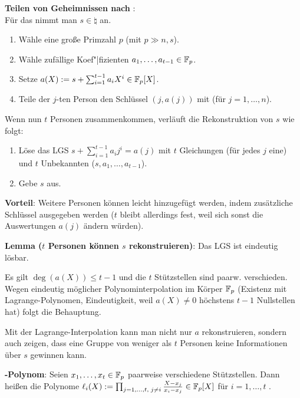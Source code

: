 \textbf{Teilen von Geheimnissen nach }:\\
Für das  nimmt man $s \in \natural$ an.
\begin{enumerate}
    \item
    Wähle eine große Primzahl $p$ (mit $p \gg n, s$).

    \item
    Wähle zufällige Koef"|fizienten $a_1, \dotsc, a_{t-1} \in \mathbb{F}_p$.

    \item
    Setze $a(X) := s + \sum_{i=1}^{t-1} a_i X^i \in \mathbb{F}_p[X]$.

    \item
    Teile der $j$-ten Person den Schlüssel $(j, a(j))$ mit (für $j = 1, \dotsc, n$).
\end{enumerate}
Wenn nun $t$ Personen zusammenkommen, verläuft die Rekonstruktion von $s$ wie folgt:
\begin{enumerate}
    \item
    Löse das LGS $s + \sum_{i=1}^{t-1} a_i j^i = a(j)$ mit $t$ Gleichungen
    (für jedes $j$ eine) und $t$ Unbekannten ($s, a_1, \dotsc, a_{t-1}$).

    \item
    Gebe $s$ aus.
\end{enumerate}

\textbf{Vorteil}:
Weitere Personen können leicht hinzugefügt werden, indem zusätzliche Schlüssel ausgegeben werden
($t$ bleibt allerdings fest, weil sich sonst die Auswertungen $a(j)$ ändern würden).

\textbf{Lemma ($t$ Personen können $s$ rekonstruieren)}:
Das LGS ist eindeutig lösbar.

\begin{Beweis}
    Es gilt $\deg(a(X)) \le t - 1$ und die $t$ Stützstellen sind paarw. verschieden.
    Wegen eindeutig möglicher Polynominterpolation im Körper $\mathbb{F}_p$
    (Existenz mit Lagrange-Polynomen, Eindeutigkeit, weil $a(X) \not= 0$
    höchstens $t - 1$ Nullstellen hat) folgt die Behauptung.
\end{Beweis}

\linie

Mit der Lagrange-Interpolation kann man nicht nur $a$ rekonstruieren,
sondern auch zeigen, dass eine Gruppe von weniger als $t$ Personen keine
Informationen über $s$ gewinnen kann.

\textbf{-Polynom}:
Seien $x_1, \dotsc, x_t \in \mathbb{F}_p$ paarweise verschiedene Stützstellen.
Dann heißen die Polynome
$\ell_i(X) := \prod_{j=1,\dotsc,t,\;j\not=i} \frac{X - x_j}{x_i - x_j} \in \mathbb{F}_p[X]$
für $i = 1, \dotsc, t$ .

